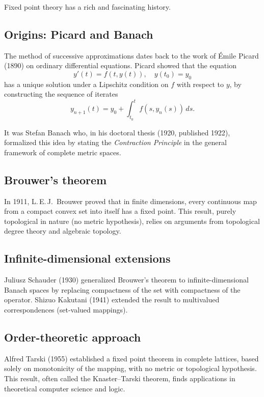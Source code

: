 Fixed point theory has a rich and fascinating history.

\subsection{Origins: Picard and Banach}

The method of successive approximations dates back to the work of \'Emile Picard
(1890) on ordinary differential equations. Picard showed that the equation
\[
    y'(t) = f(t, y(t)), \quad y(t_0) = y_0
\]
has a unique solution under a Lipschitz condition on $f$ with respect to $y$,
by constructing the sequence of iterates
\[
    y_{n+1}(t) = y_0 + \int_{t_0}^{t} f(s, y_n(s)) \, ds.
\]

It was Stefan Banach who, in his doctoral thesis (1920, published 1922),
formalized this idea by stating the \emph{Contraction Principle} in the general
framework of complete metric spaces.

\subsection{Brouwer's theorem}

In 1911, L.\,E.\,J.\ Brouwer proved that in finite dimensions, every continuous
map from a compact convex set into itself has a fixed point. This result, purely
topological in nature (no metric hypothesis), relies on arguments from
topological degree theory and algebraic topology.

\subsection{Infinite-dimensional extensions}

Juliusz Schauder (1930) generalized Brouwer's theorem to infinite-dimensional
Banach spaces by replacing compactness of the set with compactness of the
operator. Shizuo Kakutani (1941) extended the result to multivalued
correspondences (set-valued mappings).

\subsection{Order-theoretic approach}

Alfred Tarski (1955) established a fixed point theorem in complete lattices,
based solely on monotonicity of the mapping, with no metric or topological
hypothesis. This result, often called the Knaster--Tarski theorem, finds
applications in theoretical computer science and logic.

